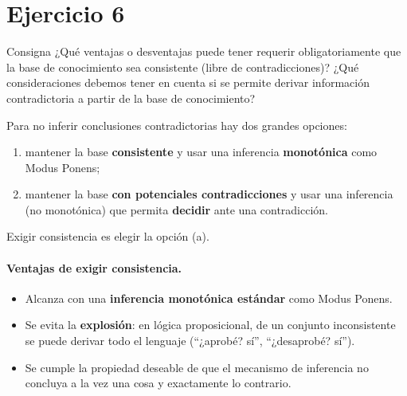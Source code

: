 \documentclass[11pt,a4paper]{article}
\begin{document}
\section{Ejercicio 6}

\begin{enunciado}{Consigna}
¿Qué ventajas o desventajas puede tener requerir obligatoriamente que la base de conocimiento sea consistente (libre de contradicciones)? ¿Qué consideraciones debemos tener en cuenta si se permite derivar información contradictoria a partir de la base de conocimiento?
\end{enunciado}

Para no inferir conclusiones contradictorias hay dos grandes opciones:
\begin{enumerate}[label=\alph*)]
  \item mantener la base \textbf{consistente} y usar una inferencia \textbf{monotónica} como Modus Ponens;
  \item mantener la base \textbf{con potenciales contradicciones} y usar una inferencia (no monotónica) que permita \textbf{decidir} ante una contradicción.
\end{enumerate}
Exigir consistencia es elegir la opción (a).

\paragraph{Ventajas de exigir consistencia.}
\begin{itemize}
  \item Alcanza con una \textbf{inferencia monotónica estándar} como Modus Ponens.
  \item Se evita la \textbf{explosión}: en lógica proposicional, de un conjunto inconsistente se puede derivar todo el lenguaje (``¿aprobé? sí'', ``¿desaprobé? sí'').
  \item Se cumple la propiedad deseable de que el mecanismo de inferencia no concluya a la vez una cosa y exactamente lo contrario.
\end{itemize}
\end{document}
